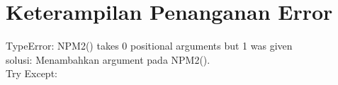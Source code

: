 \section{Keterampilan Penanganan Error}
TypeError: NPM2() takes 0 positional arguments but 1 was given \\
solusi: Menambahkan argument pada NPM2().\\


Try Except:






